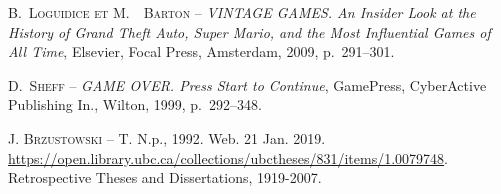 {\scshape B.~{Loguidice} et M.~~{Barton}} -- \textit{{VINTAGE GAMES. An  Insider Look  at the History of Grand Theft Auto, Super Mario, and the Most Influential Games of All Time}}, Elsevier, Focal Press, Amsterdam, 2009, p.~291--301.

\bibitem{}
{\scshape D.~{Sheff}} -- \textit{{GAME OVER. Press Start to Continue}}, GamePress, CyberActive Publishing In., Wilton, 1999, p.~292--348.

\bibitem{}
{\scshape J. Brzustowski} --  T. N.p., 1992. Web. 21 Jan. 2019. \url{https://open.library.ubc.ca/collections/ubctheses/831/items/1.0079748}. Retrospective Theses and Dissertations, 1919-2007.


